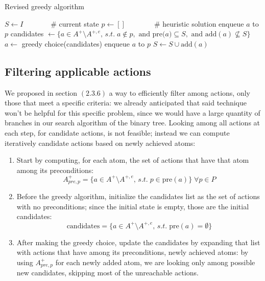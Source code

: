 \begin{algorithm}[h]
    \caption{Revised greedy algorithm}
    \begin{algorithmic}
        \State $S\gets I\qquad\quad\;\;\;$\# current state
        \State $p\gets []\qquad\qquad$\# heuristic solution
                \State enqueue $a$ to $p$
            \Else
                \State candidates $\gets\{a\in A^+\setminus A^{+,e},\,s.t.\;a\not\in p,\mbox{ and pre(}a)\subseteq S,\mbox{ and add}(a)\not\subseteq S\}$
                \State $a\gets$ greedy choice(candidates)
                \State enqueue $a$ to $p$
            \EndIf
            \State $S\gets S\cup\mbox{add}(a)$
        \EndWhile
    \end{algorithmic}
\end{algorithm}

\subsection{Filtering applicable actions}

We proposed in section $(2.3.6)$ a way to efficiently filter among actions, only those that meet a specific criteria: we already anticipated that said technique won't be helpful for this specific problem, since we would have a large quantity of branches in our search algorithm of the binary tree. Looking among all actions at each step, for candidate actions, is not feasible; instead we can compute iteratively candidate actions based on newly achieved atoms:
\begin{enumerate}
    \item Start by computing, for each atom, the set of actions that have that atom among its preconditions: $$A^+_{pre,p}=\{a\in A^+\setminus A^{+,e},\,s.t.\;p\in\mbox{pre}(a)\}\;\forall p\in P$$
    \item Before the greedy algorithm, initialize the candidates list as the set of actions with no preconditions; since the initial state is empty, those are the initial candidates:
    $$\mbox{candidates}=\{a\in A^+\setminus A^{+,e},\,s.t.\;\mbox{pre}(a)=\emptyset\}$$
    \item After making the greedy choice, update the candidates by expanding that list with actions that have among its preconditions, newly achieved atoms: by using $A^+_{pre,p}$ for each newly added atom, we are looking only among possible new candidates, skipping most of the unreachable actions.
\end{enumerate}

